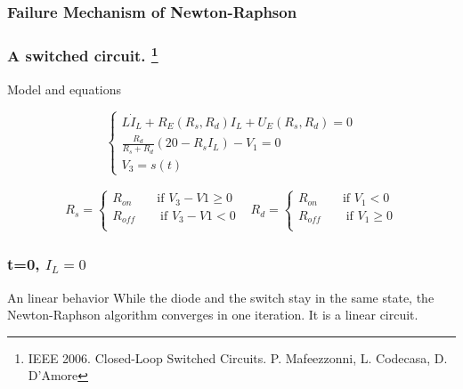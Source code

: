 
\frame
{
  \frametitle{Failure Mechanism of Newton-Raphson}

}

        
\frame
{

\frametitle{A switched circuit. \footnote{IEEE 2006. Closed-Loop Switched Circuits. P. Mafeezzonni, L. Codecasa, D. D'Amore}}
  \begin{figure}[!h]
   \centerline{
   \scalebox{0.9}{
    
    }
 } 
 \end{figure}



 
}

\frame
{

  \begin{figure}[!h]
   \centerline{
   \scalebox{0.9}{
    
    }
 } 
 \end{figure}
\begin{block}{Model and equations}

\[
\begin{cases}
L \dot I_L + R_E(R_s,R_d)I_L + U_E(R_s,R_d) =0 \\
\frac{R_d}{R_s+R_d} (20 - R_sI_L)-V_1=0\\
V_3=s(t)
\end{cases}
\]


\begin{equation}
\begin{array}{cc}
R_s= \begin{cases}
R_{on} \qquad \text{if $V_3-V1 \geq 0$}\\
R_{off} \qquad \text{if $V_3-V1 < 0$}\\
\end{cases}&
R_d= \begin{cases}
R_{on} \qquad \text{if $V_1 < 0$}\\
R_{off} \qquad \text{if $V_1 \geq 0$}\\
\end{cases}
\end{array}
\end{equation}

\end{block}

 }


 
 \frame
{

\frametitle{t=0, $I_L=0$}
  \begin{figure}[!h]
   \centerline{
   \scalebox{0.9}{
    
    }
 } 
 \end{figure}
 

 \begin{block}{An linear behavior}
While the diode and the switch stay in the same state, the Newton-Raphson algorithm converges in
one iteration. It is a linear circuit.

\end{block}
 }

